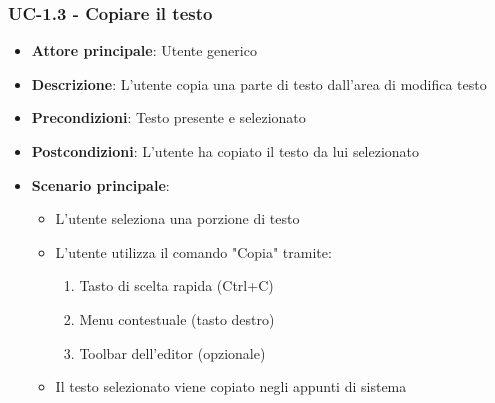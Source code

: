 \documentclass[11pt,a4paper]{article}
\begin{document}
\subsubsection{UC-1.3 - Copiare il testo}
\begin{itemize}
    \item \textbf{Attore principale}: Utente generico
    \item \textbf{Descrizione}: L'utente copia una parte di testo dall'area di modifica testo
    \item \textbf{Precondizioni}: Testo presente e selezionato
    \item \textbf{Postcondizioni}: L'utente ha copiato il testo da lui selezionato
    \item \textbf{Scenario principale}:
        \begin{itemize}
            \item L'utente seleziona una porzione di testo
            \item L'utente utilizza il comando "Copia" tramite:
                \begin{enumerate}
                    \item Tasto di scelta rapida (Ctrl+C)
                    \item Menu contestuale (tasto destro)
                    \item Toolbar dell'editor (opzionale)
                \end{enumerate}
            \item Il testo selezionato viene copiato negli appunti di sistema
        \end{itemize}
\end{itemize}
\end{document}
